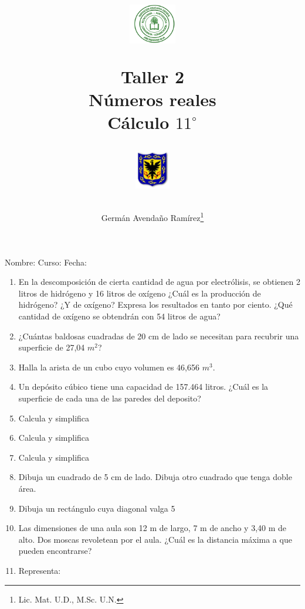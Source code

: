 \documentclass[10pt,twoside]{article}
\author{Germ\'an Avenda\~no Ram\'irez\thanks{Lic. Mat. U.D., M.Sc. U.N.}}
\title{\begin{minipage}{.2\textwidth}
\includegraphics[height=1.75cm]{Images/logo-colegio.png}\end{minipage}
\begin{minipage}{.55\textwidth}
\begin{center}
Taller 2\\
Números reales\\
Cálculo $11^{\circ}$
\end{center}
\end{minipage}\hfill
\begin{minipage}{.2\textwidth}
\includegraphics[height=1.75cm]{Images/logo-sed.png} 
\end{minipage}}
\date{}
\begin{document}
\maketitle
Nombre: \hrulefill Curso: \underline{\hspace*{44pt}} Fecha: \underline{\hspace*{2.5cm}}\\

\begin{enumerate}
  \item En la descomposición de cierta cantidad de agua por electrólisis, se obtienen 2 litros de hidrógeno y 16 litros de oxígeno ¿Cuál es la producción de hidrógeno? ¿Y de oxígeno? Expresa los resultados en tanto por ciento. ¿Qué cantidad de oxígeno se obtendrán con 54 litros de agua?
  \item ¿Cuántas baldosas cuadradas de 20 cm de lado se necesitan para recubrir una superficie de 27,04 $ m^2 $?
  \item Halla la arista de un cubo cuyo volumen es 46,656 $m^3$.
  \item Un depósito cúbico tiene una capacidad de 157.464 litros. ¿Cuál es la superficie de cada una de las paredes del deposito?
\item Calcula y simplifica
\begin{enumerate}
\end{enumerate}
\item Calcula y simplifica
\begin{enumerate}
\end{enumerate}
\item Calcula y simplifica
\begin{enumerate}
\end{enumerate}
\item Dibuja un cuadrado de 5 cm de lado. Dibuja otro cuadrado que tenga doble área.
\item Dibuja un rectángulo cuya diagonal valga 5
\item Las dimensiones de una aula son 12 m de largo, 7 m de ancho y 3,40 m de alto. Dos moscas revoletean por el aula. ¿Cuál es la distancia máxima a que pueden encontrarse?
\item Representa:\\


\end{enumerate}
\end{document}

